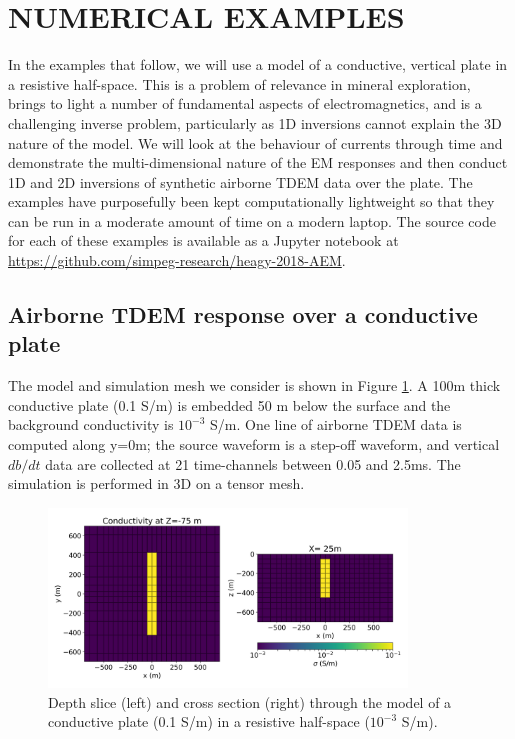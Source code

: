 \documentclass[paper]{geophysics}
\begin{document}
\section{NUMERICAL EXAMPLES}
In the examples that follow, we will use a model of a conductive, vertical plate in a resistive half-space. This is a problem of relevance in mineral exploration, brings to light a number of fundamental aspects of electromagnetics, and is a challenging inverse problem, particularly as 1D inversions cannot explain the 3D nature of the model. We will look at the behaviour of currents through time and demonstrate the multi-dimensional nature of the EM responses and then conduct 1D and 2D inversions of synthetic airborne TDEM data over the plate. The examples have purposefully been kept computationally lightweight so that they can be run in a moderate amount of time on a modern laptop. The source code for each of these examples is available as a Jupyter notebook at
\href{https://github.com/simpeg-research/heagy-2018-AEM}{https://github.com/simpeg-research/heagy-2018-AEM}.

\subsection{Airborne TDEM response over a conductive plate}
The model and simulation mesh we consider is shown in Figure \ref{fig:model}. A 100m thick conductive plate (0.1 S/m) is embedded 50 m below the surface and the background conductivity is $10^{-3}$ S/m. One line of airborne TDEM data is computed along y=0m; the source waveform is a step-off waveform, and vertical $db/dt$ data are collected at 21 time-channels between 0.05 and 2.5ms. The simulation is performed in 3D on a tensor mesh.

\begin{figure}[!htb]
  \centering
  \includegraphics[width=0.85\textwidth]{figures/model.png}
  \caption{Depth slice (left) and cross section (right) through the model of a conductive plate (0.1 S/m) in a resistive half-space ($10^{-3}$ S/m).}
  \label{fig:model}
\end{figure}
\end{document}
